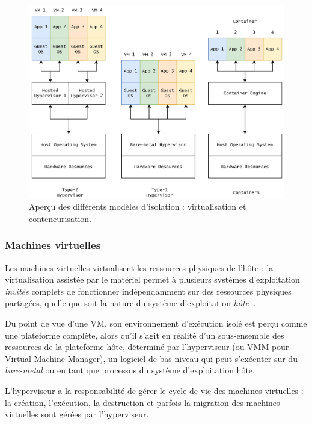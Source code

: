 \begin{figure}[htbp]
    \centering
	\includegraphics[width=\textwidth]{2_Chapitre2/figures/virtualization.png}
	\caption{Aperçu des différents modèles d'isolation : virtualisation et conteneurisation.}
	\label{fig:virtualization}
\end{figure}

\subsubsection{Machines virtuelles}

Les machines virtuelles virtualisent les ressources physiques de l'hôte : la virtualisation assistée par le matériel permet à plusieurs systèmes d'exploitation \textit{invités} complets de fonctionner indépendamment sur des ressources physiques partagées, quelle que soit la nature du système d'exploitation \textit{hôte}~\cite{kivityKvmLinuxVirtual}.

Du point de vue d'une VM, son environnement d'exécution isolé est perçu comme une plateforme complète, alors qu'il s'agit en réalité d'un sous-ensemble des ressources de la plateforme hôte, déterminé par l'hyperviseur (ou VMM pour Virtual Machine Manager), un logiciel de bas niveau qui peut s'exécuter sur du \textit{bare-metal} ou en tant que processus du système d'exploitation hôte.

L'hyperviseur a la responsabilité de gérer le cycle de vie des machines virtuelles : la création, l'exécution, la destruction et parfois la migration des machines virtuelles sont gérées par l'hyperviseur.

